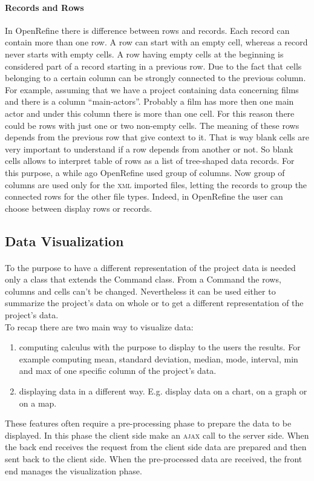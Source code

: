\paragraph{Records and Rows} In OpenRefine there is difference between rows and records. Each record can contain more than one row. A row can start with an empty cell, whereas a record never starts with empty cells. A row having empty cells at the beginning is considered part of a record starting in a previous row. Due to the fact that cells belonging to a certain column can be strongly connected to the previous column. For example, assuming that we have a project containing data concerning films and there is a column ``main-actors''. Probably a film has more then one main actor and under this column there is more than one cell. For this reason there could be rows with just one or two non-empty cells. The meaning of these rows depends from the previous row that give context to it. That is way blank cells are very important to understand if a row depends from another or not. So blank cells allows to interpret table of rows as a list of tree-shaped data records. For this purpose, a while ago OpenRefine used group of columns. Now group of columns are used only for the \textsc{xml} imported files, letting the records to group the connected rows for the other file types. Indeed, in OpenRefine the user can choose between display rows or records.

\subsection{Data Visualization}
\paragraph{} To the purpose to have a different representation of the project data is needed only a class that extends the Command class. From a Command the rows, columns and cells can't be changed. Nevertheless it can be used either to summarize the project's data on whole or to get a different representation of the project's data. \\
To recap there are two main way to visualize data:
\begin{enumerate}
	\item computing calculus with the purpose to display to the users the results. For example computing mean, standard deviation, median, mode, interval, min and max of one specific column of the project's data. 
	\item displaying data in a different way. E.g. display data on a chart, on a graph or on a map.
\end{enumerate}
These features often require a pre-processing phase to prepare the data to be displayed. In this phase the client side make an \textsc{ajax} call to the server side. When the back end receives the request from the client side data are prepared and then sent back to the client side. When the pre-processed data are received, the front end manages the visualization phase. \\

